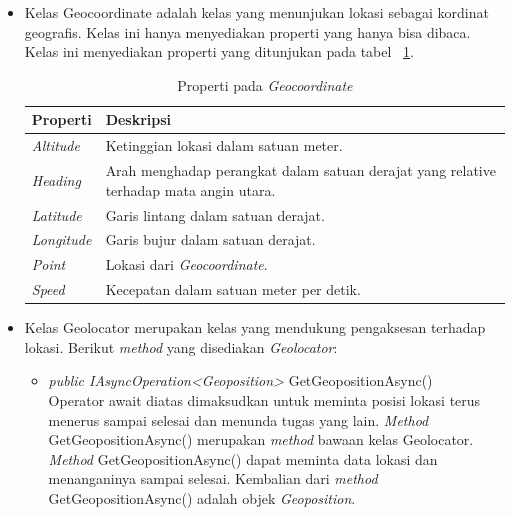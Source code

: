 \begin{itemize}
	\item Kelas Geocoordinate adalah kelas yang menunjukan lokasi sebagai kordinat geografis. Kelas ini hanya menyediakan properti yang hanya bisa dibaca. Kelas ini menyediakan properti yang ditunjukan pada tabel ~\ref{tab:PropertiPadaKelasGeocoordinate}. \\
			\begin{table}[h]
				\centering
					\begin{tabular}{ |p{4cm}|p{10cm}|}
							\hline
							Properti & Deskripsi \\ \hline
							\textit{Altitude} & Ketinggian lokasi dalam satuan meter. \\ \hline
							\textit{Heading} & Arah menghadap perangkat dalam satuan derajat yang relative terhadap mata angin utara. \\ \hline
							\textit{Latitude} & Garis lintang dalam satuan derajat. \\ \hline
							\textit{Longitude}  & Garis bujur dalam satuan derajat. \\ \hline
							\textit{Point} & Lokasi dari \textit{Geocoordinate}. \\ \hline
							\textit{Speed} & Kecepatan dalam satuan meter per detik. \\ \hline
							\hline
					\end{tabular}
				\caption{Properti pada \textit{Geocoordinate}}
				\label{tab:PropertiPadaKelasGeocoordinate}
			\end{table} 
	\item Kelas Geolocator merupakan kelas yang mendukung pengaksesan terhadap lokasi. Berikut \textit{method} yang disediakan \textit{Geolocator}: \\
			\begin{itemize}
				\item \textit{public IAsyncOperation<Geoposition>} GetGeopositionAsync() \\
					Operator await diatas dimaksudkan untuk meminta posisi lokasi terus menerus sampai selesai dan menunda tugas yang lain. \textit{Method} GetGeopositionAsync() merupakan \textit{method} bawaan kelas Geolocator. \textit{Method} GetGeopositionAsync() dapat meminta data lokasi dan menanganinya sampai selesai. Kembalian dari \textit{method} GetGeopositionAsync() adalah objek \textit{Geoposition}.
			\end{itemize}


\end{itemize}
